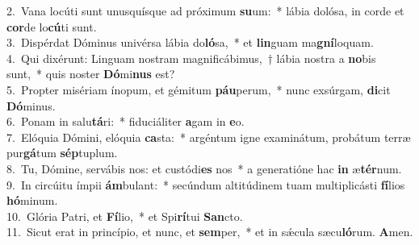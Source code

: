 {2.~}Vana locúti sunt unusquísque ad próximum \textbf{su}um:~* lábia dolósa, in corde et \textbf{cor}de lo\textbf{cú}ti sunt.\\
{3.~}Dispérdat Dóminus univérsa lábia do\textbf{ló}sa,~* et \textbf{lin}guam ma\textbf{gní}loquam.\\
{4.~}Qui dixérunt: Linguam nostram magnificábimus,~† lábia nostra a \textbf{no}bis sunt,~* quis noster \textbf{Dó}mi\textbf{nus} est?\\
{5.~}Propter misériam ínopum, et gémitum \textbf{páu}perum,~* nunc exsúrgam, \textbf{di}cit \textbf{Dó}minus.\\
{6.~}Ponam in salu\textbf{tá}ri:~* fiduciáliter \textbf{a}gam in \textbf{e}o.\\
{7.~}Elóquia Dómini, elóquia \textbf{ca}sta:~* argéntum igne examinátum, probátum terræ pur\textbf{gá}tum \textbf{sép}tuplum.\\
{8.~}Tu, Dómine, servábis nos: et custódi\textbf{es} nos~* a generatióne hac \textbf{in} æ\textbf{tér}num.\\
{9.~}In circúitu ímpii \textbf{ám}bulant:~* secúndum altitúdinem tuam multiplicásti \textbf{fí}lios \textbf{hó}minum.\\
{10.~}Glória Patri, et \textbf{Fí}lio,~* et Spi\textbf{rí}tui \textbf{San}cto.\\
{11.~}Sicut erat in princípio, et nunc, et \textbf{sem}per,~* et in sǽcula sæcu\textbf{ló}rum. \textbf{A}men.\\
